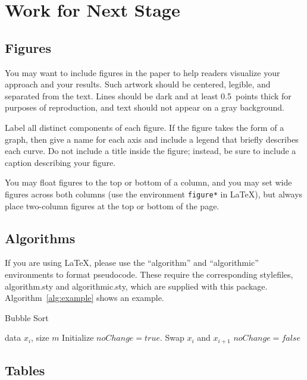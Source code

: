 \documentclass{article}
\begin{document}
\section{Work for Next Stage} 

\subsection{Figures}
 
You may want to include figures in the paper to help readers visualize
your approach and your results. Such artwork should be centered,
legible, and separated from the text. Lines should be dark and at
least 0.5~points thick for purposes of reproduction, and text should
not appear on a gray background.

Label all distinct components of each figure. If the figure takes the
form of a graph, then give a name for each axis and include a legend
that briefly describes each curve. Do not include a title inside the
figure; instead, be sure to include a caption describing your figure.

You may float figures to the top or
bottom of a column, and you may set wide figures across both columns
(use the environment {\tt figure*} in \LaTeX), but always place
two-column figures at the top or bottom of the page. 

\subsection{Algorithms}

If you are using \LaTeX, please use the ``algorithm'' and ``algorithmic'' 
environments to format pseudocode. These require 
the corresponding stylefiles, algorithm.sty and 
algorithmic.sty, which are supplied with this package. 
Algorithm~\ref{alg:example} shows an example. 

\begin{algorithm}[tb]
   \caption{Bubble Sort}
   \label{alg:example}
\begin{algorithmic}
    data $x_i$, size $m$
   \REPEAT
   \STATE Initialize $noChange = true$.
   \STATE Swap $x_i$ and $x_{i+1}$
   \STATE $noChange = false$
   \ENDIF
   \ENDFOR
\end{algorithmic}
\end{algorithm}
 
\subsection{Tables} 
 
\end{document}

